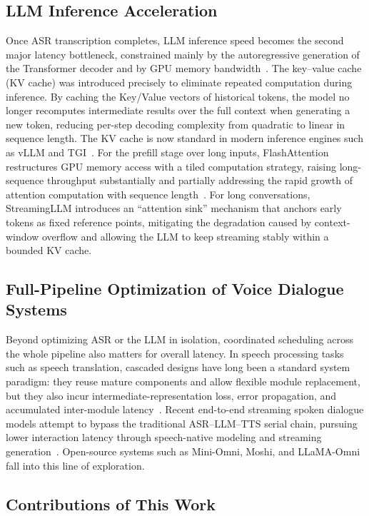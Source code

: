 \documentclass[a4paper,11pt]{article}
\begin{document}
\subsection{LLM Inference Acceleration}

Once ASR transcription completes, LLM inference speed becomes the second major latency bottleneck, constrained mainly by the autoregressive generation of the Transformer decoder and by GPU memory bandwidth~\cite{ref7}. The key--value cache (KV cache) was introduced precisely to eliminate repeated computation during inference. By caching the Key/Value vectors of historical tokens, the model no longer recomputes intermediate results over the full context when generating a new token, reducing per-step decoding complexity from quadratic to linear in sequence length. The KV cache is now standard in modern inference engines such as vLLM and TGI~\cite{ref8}. For the prefill stage over long inputs, FlashAttention restructures GPU memory access with a tiled computation strategy, raising long-sequence throughput substantially and partially addressing the rapid growth of attention computation with sequence length~\cite{ref9}. For long conversations, StreamingLLM introduces an ``attention sink'' mechanism that anchors early tokens as fixed reference points, mitigating the degradation caused by context-window overflow and allowing the LLM to keep streaming stably within a bounded KV cache.

\subsection{Full-Pipeline Optimization of Voice Dialogue Systems}

Beyond optimizing ASR or the LLM in isolation, coordinated scheduling across the whole pipeline also matters for overall latency. In speech processing tasks such as speech translation, cascaded designs have long been a standard system paradigm: they reuse mature components and allow flexible module replacement, but they also incur intermediate-representation loss, error propagation, and accumulated inter-module latency~\cite{ref10}. Recent end-to-end streaming spoken dialogue models attempt to bypass the traditional ASR--LLM--TTS serial chain, pursuing lower interaction latency through speech-native modeling and streaming generation~\cite{ref11}. Open-source systems such as Mini-Omni, Moshi, and LLaMA-Omni fall into this line of exploration.

\subsection{Contributions of This Work}
\end{document}
